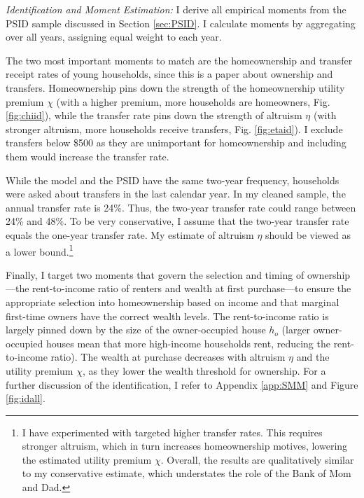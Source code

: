 \documentclass[12pt]{article}
\begin{document}
\textit{Identification and Moment Estimation:}
I derive all empirical moments from the PSID sample discussed in Section \ref{sec:PSID}. I calculate moments by aggregating over all years, assigning equal weight to each year.

The two most important moments to match are the homeownership and transfer receipt rates of young households, since this is a paper about ownership and transfers. Homeownership pins down the strength of the homeownership utility premium $\chi$ (with a higher premium, more households are homeowners, Fig. \ref{fig:chiid}), while the transfer rate pins down the strength of altruism $\eta$ (with stronger altruism, more households receive transfers, Fig. \ref{fig:etaid}). I exclude transfers below \$500 as they are unimportant for homeownership and including them would increase the transfer rate.

While the model and the PSID have the same two-year frequency, households were asked about transfers in the last calendar year. In my cleaned sample, the annual transfer rate is 24\%. Thus, the two-year transfer rate could range between 24\% and 48\%. To be very conservative, I assume that the two-year transfer rate equals the one-year transfer rate. My estimate of altruism $\eta$ should be viewed as a lower bound.\footnote{I have experimented with targeted higher transfer rates. This requires stronger altruism, which in turn increases homeownership motives, lowering the estimated utility premium $\chi$. Overall, the results are qualitatively similar to my conservative estimate, which understates the role of the Bank of Mom and Dad.}

Finally, I target two moments that govern the selection and timing of ownership---the rent-to-income ratio of renters and wealth at first purchase---to ensure the appropriate  selection into homeownership based on income and that marginal first-time owners have the correct wealth levels. The rent-to-income ratio is largely pinned down by the size of the owner-occupied house $h_o$ (larger owner-occupied houses mean that more high-income households rent, reducing the rent-to-income ratio). The wealth at purchase decreases with altruism $\eta$ and the utility premium $\chi$, as they lower the wealth threshold for ownership. For a further discussion of the identification, I refer to Appendix \ref{app:SMM} and Figure \ref{fig:idall}.
\end{document}
